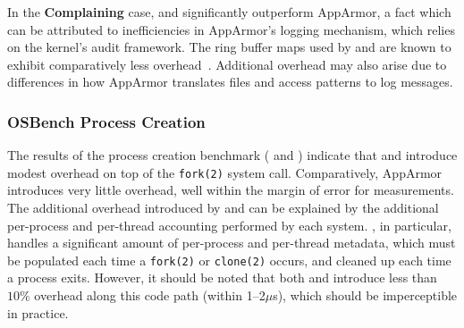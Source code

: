 In the \textbf{Complaining} case, \bpfbox{} and \bpfcontain{} significantly outperform
AppArmor, a fact which can be attributed to inefficiencies in AppArmor's logging
mechanism, which relies on the kernel's audit framework. The ring buffer maps used by
\bpfbox{} and \bpfcontain{} are known to exhibit comparatively less
overhead~\cite{zeng2015_auditing, zhang2021_lsm_file_overhead, nakryiko2020_ringbuf}.
Additional overhead may also arise due to differences in how AppArmor translates files and
access patterns to log messages.

\subsubsection{OSBench Process Creation}

The results of the process creation benchmark ( and ) indicate
that \bpfbox{} and \bpfcontain{} introduce modest overhead on top of the \texttt{fork(2)}
system call.  Comparatively, AppArmor introduces very little overhead, well within the
margin of error for measurements. The additional overhead introduced by \bpfbox{} and
\bpfcontain{} can be explained by the additional per-process and per-thread accounting
performed by each system. \bpfcontain{}, in particular, handles a significant amount of
per-process and per-thread metadata, which must be populated each time a \texttt{fork(2)}
or \texttt{clone(2)} occurs, and cleaned up each time a process exits. However, it should
be noted that both \bpfbox{} and \bpfcontain{} introduce less than $10\%$ overhead along
this code path (within 1--2$\mu$s), which should be imperceptible in practice.


